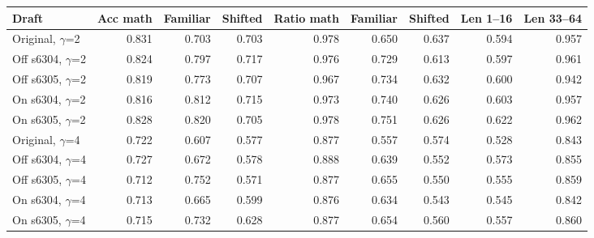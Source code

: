 \scriptsize
\setlength{\tabcolsep}{3.5pt}
\label{tab:t3subsets}
\begin{adjustbox}{max width=\linewidth}
\begin{tabular}{lrrrrrrrr}
\toprule
Draft & Acc math & Familiar & Shifted & Ratio math & Familiar & Shifted & Len 1--16 & Len 33--64 \\
\midrule
Original, $\gamma$=2 & 0.831 & 0.703 & 0.703 & 0.978 & 0.650 & 0.637 & 0.594 & 0.957 \\
Off s6304, $\gamma$=2 & 0.824 & 0.797 & 0.717 & 0.976 & 0.729 & 0.613 & 0.597 & 0.961 \\
Off s6305, $\gamma$=2 & 0.819 & 0.773 & 0.707 & 0.967 & 0.734 & 0.632 & 0.600 & 0.942 \\
On s6304, $\gamma$=2 & 0.816 & 0.812 & 0.715 & 0.973 & 0.740 & 0.626 & 0.603 & 0.957 \\
On s6305, $\gamma$=2 & 0.828 & 0.820 & 0.705 & 0.978 & 0.751 & 0.626 & 0.622 & 0.962 \\
\midrule
Original, $\gamma$=4 & 0.722 & 0.607 & 0.577 & 0.877 & 0.557 & 0.574 & 0.528 & 0.843 \\
Off s6304, $\gamma$=4 & 0.727 & 0.672 & 0.578 & 0.888 & 0.639 & 0.552 & 0.573 & 0.855 \\
Off s6305, $\gamma$=4 & 0.712 & 0.752 & 0.571 & 0.877 & 0.655 & 0.550 & 0.555 & 0.859 \\
On s6304, $\gamma$=4 & 0.713 & 0.665 & 0.599 & 0.876 & 0.634 & 0.543 & 0.545 & 0.842 \\
On s6305, $\gamma$=4 & 0.715 & 0.732 & 0.628 & 0.877 & 0.654 & 0.560 & 0.557 & 0.860 \\
\bottomrule
\end{tabular}
\end{adjustbox}

